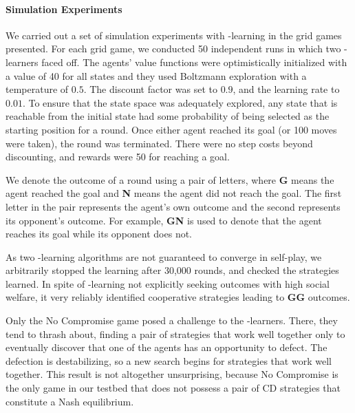 
\paragraph{Simulation Experiments}
\label{sec:qlearning}

We carried out a set of simulation experiments with \Q-learning in
the grid games presented.
%
For each grid game, we conducted 50 independent runs in which two
\Q-learners faced off.  
The agents' value functions were optimistically initialized with a
value of 40 for all states and they used Boltzmann exploration with a
temperature of $0.5$.  The discount factor was set to $0.9$, and the
learning rate to $0.01$.  To ensure that the state space was
adequately explored, any state that is reachable from the initial
state had some probability of being selected as the starting position
for a round.  Once either agent reached its goal (or 100 moves were
taken), the round was terminated.  There were no step costs beyond discounting, and
rewards were 50 for reaching a goal.

We denote the outcome of a round using a pair of letters, where {\bf G} 
means the agent reached the goal and {\bf N} means the agent did not
reach the goal. The first letter in the pair represents the agent's
own outcome and the second represents its opponent's outcome. For
example, {\bf GN} is used to denote that the agent reaches its goal
while its opponent does not.

As two \Q-learning algorithms are not guaranteed to converge in
self-play, we arbitrarily stopped the learning after 30,000 rounds,
and checked the strategies learned.  In spite of \Q-learning not
explicitly seeking outcomes with high social welfare, it very reliably
identified cooperative strategies leading to {\bf GG} outcomes.

Only the No Compromise game posed a challenge to the \Q-learners.
There, they tend to thrash about, finding a pair of strategies that
work well together only to eventually discover that one of the agents
has an opportunity to defect.  The defection is destabilizing, so a
new search begins for strategies that work well together.  This result
is not altogether unsurprising, because No Compromise is the only game
in our testbed that does not possess a pair of CD strategies that
constitute a Nash equilibrium.


